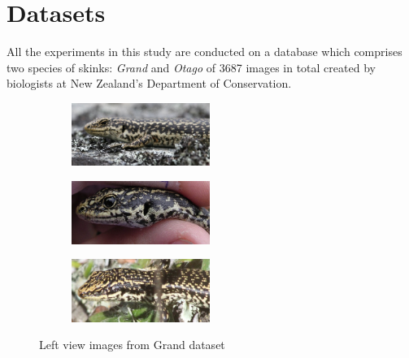 \graphicspath{{images/chap3/}}

\chapter{Datasets} %
\label{cha:datasets}

All the experiments in this study are conducted on a database which comprises
two species of skinks: \emph{Grand} and \emph{Otago} of 3687 images in total
created by biologists at New Zealand's Department of Conservation.

\begin{figure}[htb]
  \centering
  \begin{subfigure}[t]{0.31\textwidth}
      \centering
      \includegraphics[width=4.5cm]{dataset/general/grand_L3}
  \end{subfigure}
  \begin{subfigure}[t]{0.31\textwidth}
      \centering
      \includegraphics[width=4.5cm]{dataset/general/grand_L1}
  \end{subfigure}
  \begin{subfigure}[t]{0.31\textwidth}
      \centering
      \includegraphics[width=4.5cm]{dataset/general/grand_L2}
  \end{subfigure}
  \captionsetup{justification=centering}
  \caption{Left view images from Grand dataset}
  \label{fig:grand_left} %
\end{figure}

